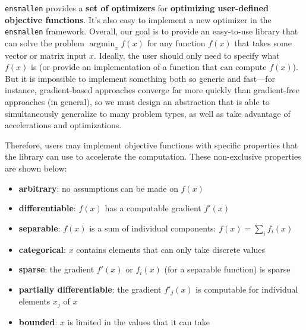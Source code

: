 \documentclass{article}
\begin{document}
{\tt ensmallen} provides a {\bf set of optimizers} for
{\bf optimizing user-defined objective functions}.  It's also easy to implement a
new optimizer in the {\tt ensmallen} framework.  Overall, our goal is to provide
an easy-to-use library that can solve the problem
$\operatorname{argmin}_{x} f(x)$
for any function $f(x)$ that takes some vector or matrix input $x$.  Ideally,
the user should only need to specify what $f(x)$ is (or provide an
implementation of a function that can compute $f(x)$).  But it is impossible to
implement something both so generic and fast---for instance, gradient-based
approaches converge far more quickly than gradient-free approaches (in general),
so we must design an abstraction that is able to simultaneously generalize to
many problem types, as well as take advantage of accelerations and
optimizations.

Therefore, users may implement objective functions with specific properties that
the library can use to accelerate the computation.  These non-exclusive
properties are shown below:

\vspace*{-0.3em}
\begin{itemize} \itemsep -1pt
  \item {\bf arbitrary}: no assumptions can be made on $f(x)$
  \item {\bf differentiable}: $f(x)$ has a computable gradient $f'(x)$
  \item {\bf separable}: $f(x)$ is a sum of individual components: $f(x) =
\sum_{i} f_i(x)$
  \item {\bf categorical}: $x$ contains elements that can only take discrete
values
  \item {\bf sparse}: the gradient $f'(x)$ or $f_i(x)$ (for a separable
function) is sparse
  \item {\bf partially differentiable}: the gradient $f'_j(x)$ is computable for
individual elements $x_j$ of $x$
  \item {\bf bounded}: $x$ is limited in the values that it can take
\end{itemize}
\vspace*{-0.3em}
\end{document}
